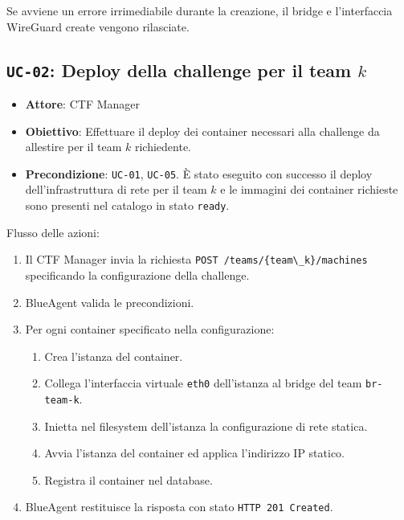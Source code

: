 Se avviene un errore irrimediabile durante la creazione, il bridge e
l'interfaccia WireGuard create vengono rilasciate.

\subsection{\texorpdfstring{\texttt{UC-02}: Deploy della challenge per
il team
\(k\)}{UC-02: Deploy della challenge per il team k}}\label{uc-02-deploy-della-challenge-per-il-team-k}

\begin{itemize}
\tightlist
\item
  \textbf{Attore}: CTF Manager
\item
  \textbf{Obiettivo}: Effettuare il deploy dei container necessari alla
  challenge da allestire per il team \(k\) richiedente.
\item
  \textbf{Precondizione}: \passthrough{\lstinline!UC-01!},
  \passthrough{\lstinline!UC-05!}. È stato eseguito con successo il
  deploy dell'infrastruttura di rete per il team \(k\) e le immagini dei
  container richieste sono presenti nel catalogo in stato
  \passthrough{\lstinline!ready!}.
\end{itemize}

Flusso delle azioni:

\begin{enumerate}
\def\labelenumi{\arabic{enumi}.}
\tightlist
\item
  Il CTF Manager invia la richiesta
  \passthrough{\lstinline!POST /teams/\{team\_k\}/machines!}
  specificando la configurazione della challenge.
\item
  BlueAgent valida le precondizioni.
\item
  Per ogni container specificato nella configurazione:

  \begin{enumerate}
  \def\labelenumii{\arabic{enumii}.}
  \tightlist
  \item
    Crea l'istanza del container.
  \item
    Collega l'interfaccia virtuale \passthrough{\lstinline!eth0!}
    dell'istanza al bridge del team \passthrough{\lstinline!br-team-k!}.
  \item
    Inietta nel filesystem dell'istanza la configurazione di rete
    statica.
  \item
    Avvia l'istanza del container ed applica l'indirizzo IP statico.
  \item
    Registra il container nel database.
  \end{enumerate}
\item
  BlueAgent restituisce la risposta con stato
  \passthrough{\lstinline!HTTP 201 Created!}.
\end{enumerate}

